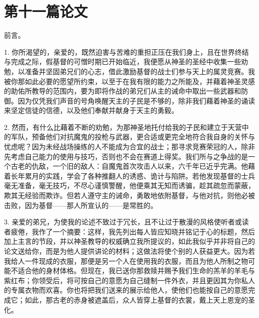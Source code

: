 
\section{第十一篇论文}

\par

前言。\par

\newline{}1. 你所渴望的，亲爱的，既然迫害与苦难的重担正压在我们身上，且在世界终结与完成之际，假基督的可憎时期已开始临近，我便愿从神圣的圣经中收集一些劝勉，以准备并坚固弟兄们的心志，借此激励基督的战士们参与天上的属灵竞赛。我被你那如此必要的愿望所约束，以至于在我有限的能力之所能及，并藉着神圣灵感的助佑所教导的范围内，要为即将作战的弟兄们从主的诫命中取出一些武器和防御。因为仅凭我们声音的号角唤醒天主的子民是不够的，除非我们藉着神圣的诵读来坚定信徒的信德，以及他们奉献并献身于天主的勇毅。\par

\newline{}2. 然而，有什么比藉着不断的劝勉，为那神圣地托付给我的子民和建立于天营中的军队，预备他们对抗魔鬼的投枪与武器，更合适或更完全地符合我自身的关怀与忧虑呢？因为未经战场操练的人不能成为合宜的战士；那寻求竞赛荣冠的人，除非先考虑自己能力的使用与技巧，否则也不会在赛道上得奖。我们所与之争战的是一个古老的仇敌，一个旧的敌人：自魔鬼首次攻击人以来，六千年已近乎完满。他藉着长年累月的实践，学会了各种推翻人的诱惑、诡计与陷阱。若他发现基督的士兵毫无准备，毫无技巧，不尽心谨慎警醒，他便乘其无知而诱骗，趁其疏忽而蒙蔽，欺其无经验而欺诈。但若人遵守主的诫命，勇敢地依附基督，与他对抗，则他必被击败，因为基督——那人所宣认的——是常胜的。\par

\newline{}3. 亲爱的弟兄，为使我的论述不致过于冗长，且不让过于散漫的风格使听者或读者疲倦，我作了一个摘要：这样，我先列出每人皆应知晓并铭记于心的标题，然后加上主言的节段，并以神圣教导的权威确立我所提议的，如此我似乎并非将自己的论文送给你，而是为他人提供讲论的材料；这做法将使个别的人获益更大。因为若我给人一件现成的衣服，那便是另一个人在使用我的衣服，而且为他人所制之物可能不适合他的身材体格。但现在，我已送你那救赎并赐予我们生命的羔羊的羊毛与紫红布；你领受后，将可按自己的意愿为自己缝制一件外衣，并且更因其为你私人的专属衣物而欢喜。你也将把我们送来的展示给他人，使他们也能按自己的意愿完成它；如此，那古老的赤身被遮盖后，众人皆穿上基督的衣裳，戴上天上恩宠的圣化。\par

